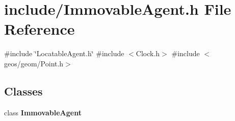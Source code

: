 \section{include/\+Immovable\+Agent.h File Reference}
\label{_immovable_agent_8h}
{\ttfamily \#include \char`\"{}Locatable\+Agent.\+h\char`\"{}}\newline
{\ttfamily \#include $<$Clock.\+h$>$}\newline
{\ttfamily \#include $<$geos/geom/\+Point.\+h$>$}\newline
\subsection*{Classes}
\begin{DoxyCompactItemize}
\item 
class \textbf{ Immovable\+Agent}
\end{DoxyCompactItemize}
